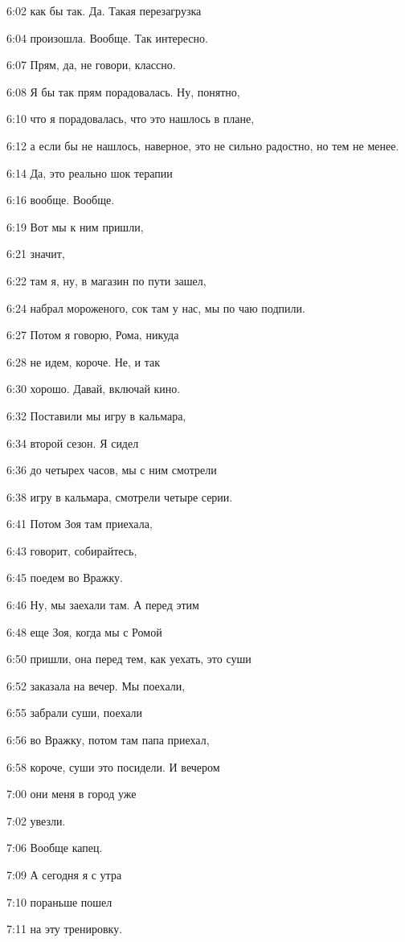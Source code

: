 6:02
как бы так. Да. Такая перезагрузка

6:04
произошла. Вообще. Так интересно.

6:07
Прям, да, не говори, классно.

6:08
Я бы так прям порадовалась. Ну, понятно,

6:10
что я порадовалась, что это нашлось в плане,

6:12
а если бы не нашлось, наверное, это не сильно радостно, но тем не менее.

6:14
Да, это реально шок терапии

6:16
вообще. Вообще.

6:19
Вот мы к ним пришли,

6:21
значит,

6:22
там я, ну, в магазин по пути зашел,

6:24
набрал мороженого, сок там у нас, мы по чаю подпили.

6:27
Потом я говорю, Рома, никуда

6:28
не идем, короче. Не, и так

6:30
хорошо. Давай, включай кино.

6:32
Поставили мы игру в кальмара,

6:34
второй сезон. Я сидел

6:36
до четырех часов, мы с ним смотрели

6:38
игру в кальмара, смотрели четыре серии.

6:41
Потом Зоя там приехала,

6:43
говорит, собирайтесь,

6:45
поедем во Вражку.

6:46
Ну, мы заехали там. А перед этим

6:48
еще Зоя, когда мы с Ромой

6:50
пришли, она перед тем, как уехать, это суши

6:52
заказала на вечер. Мы поехали,

6:55
забрали суши, поехали

6:56
во Вражку, потом там папа приехал,

6:58
короче, суши это посидели. И вечером

7:00
они меня в город уже

7:02
увезли.

7:06
Вообще капец.

7:09
А сегодня я с утра

7:10
пораньше пошел

7:11
на эту тренировку.


